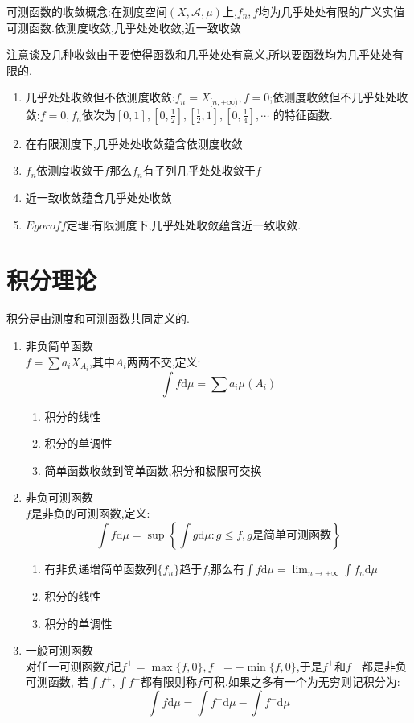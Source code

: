 可测函数的收敛概念:在测度空间$(X,\mathscr{A},\mu)$上,$f_n,f$均为几乎处处有限的广义实值可测函数.依测度收敛,几乎处处收敛,近一致收敛

注意谈及几种收敛由于要使得函数和几乎处处有意义,所以要函数均为几乎处处有限的.
\begin{enumerate}
  \item 几乎处处收敛但不依测度收敛:$f_n=X_{[n,+\infty)},f=0$;依测度收敛但不几乎处处收敛:$f=0,f_n$依次为$[0,1],[0,\frac{1} {2}],[\frac{1}{2},1],[0,\frac{1}{4}],\cdots$ 的特征函数.
  \item 在有限测度下,几乎处处收敛蕴含依测度收敛
  \item $f_n$依测度收敛于$f$那么$f_n$有子列几乎处处收敛于$f$
  \item 近一致收敛蕴含几乎处处收敛
  \item $Egoroff$定理:有限测度下,几乎处处收敛蕴含近一致收敛.
\end{enumerate}

\section{积分理论}
积分是由测度和可测函数共同定义的.
\begin{enumerate}
\item 非负简单函数\\
$f=\sum a_i X_{A_i}$,其中$A_i$两两不交,定义:
$$\int f\mathrm{d}\mu=\sum a_i\mu(A_i)$$

\begin{enumerate}
  \item 积分的线性
  \item 积分的单调性
  \item 简单函数收敛到简单函数,积分和极限可交换
\end{enumerate}

\item 非负可测函数\\
$f$是非负的可测函数,定义:
$$\int f\mathrm{d}\mu=\sup\left\{\int g\mathrm{d}\mu:g\le f,g\text{是简单可测函数}\right\}$$


\begin{enumerate}
  \item 有非负递增简单函数列$\{f_n\}$趋于$f$,那么有$\int f\mathrm{d}\mu=\lim_{n\to+\infty}
  \int f_n\mathrm{d}\mu$
  \item 积分的线性
  \item 积分的单调性
\end{enumerate}

\item 一般可测函数\\
对任一可测函数$f$记$f^+=\max\{f,0\},f^-=-\min\{f,0\}$,于是$f^+$和$f^-$ 都是非负可测函数,
若$\int f^+,\int f^-$都有限则称$f$可积,如果之多有一个为无穷则记积分为:
$$\int f\mathrm{d}\mu=\int f^+\mathrm{d}\mu-\int f^-\mathrm{d}\mu$$
\end{enumerate}

